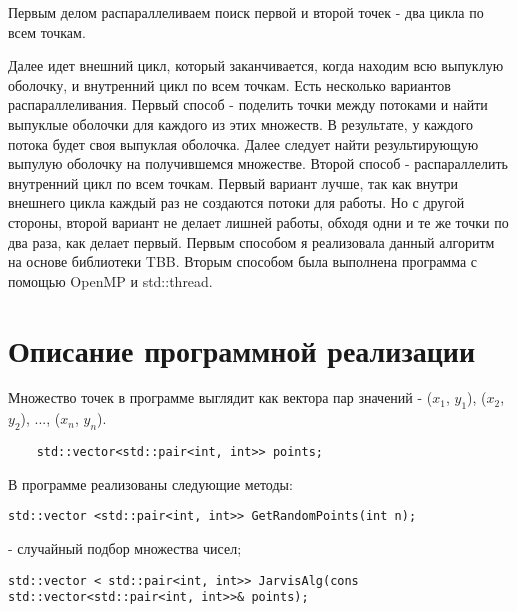 \documentclass{report}
\begin{document}
\par Первым делом распараллеливаем поиск первой и второй точек - два цикла по всем точкам.

\par Далее идет внешний цикл, который заканчивается, когда находим всю выпуклую оболочку, и внутренний цикл по всем точкам. Есть несколько вариантов распараллеливания. Первый способ - поделить точки между потоками и найти выпуклые оболочки для каждого из этих множеств. В результате, у каждого потока будет своя выпуклая оболочка. Далее следует найти результирующую выпулую оболочку на получившемся множестве. Второй способ - распараллелить внутренний цикл по всем точкам. Первый вариант лучше, так как внутри внешнего цикла каждый раз не создаются потоки для работы. Но с другой стороны, второй вариант не делает лишней работы, обходя одни и те же точки по два раза, как делает первый. Первым способом я реализовала данный алгоритм на основе библиотеки TBB. Вторым способом была выполнена программа с помощью OpenMP и std::thread.

\newpage

\section{Описание программной реализации}
Множество точек в программе выглядит как вектора пар значений - {($x_{1}$, $y_{1}$), ($x_{2}$, $y_{2}$), ..., ($x_{n}$, $y_{n}$)}.

\vspace{10pt}
\begin{lstlisting}
	std::vector<std::pair<int, int>> points;
\end{lstlisting}
\vspace{-25pt}

\par В программе реализованы следующие методы:

\vspace{10pt}
\begin{lstlisting}
std::vector <std::pair<int, int>> GetRandomPoints(int n);
\end{lstlisting}
\vspace{-25pt}

- случайный подбор множества чисел;

\vspace{10pt}
\begin{lstlisting}
std::vector < std::pair<int, int>> JarvisAlg(cons std::vector<std::pair<int, int>>& points);
\end{lstlisting}
\vspace{-25pt}
\end{document}
